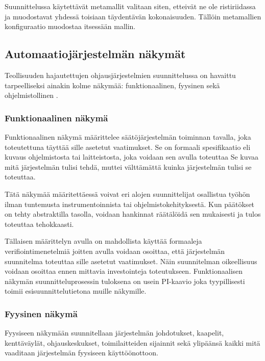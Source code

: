 \documentclass[finnish,12pt]{article}
\begin{document}
Suunnittelussa käytettävät metamallit valitaan siten, etteivät ne ole ristiriidassa ja muodostavat yhdessä toisiaan täydentävän kokonaisuuden.
Tällöin metamallien konfiguraatio muodostaa itsessään mallin.


	\subsection{Automaatiojärjestelmän näkymät}

Teollisuuden hajautettujen ohjausjärjestelmien suunnittelussa on havaittu
tarpeelliseksi ainakin kolme näkymää: funktionaalinen, fyysinen sekä ohjelmistollinen \cite{RefWorks:38}.


		\subsubsection{Funktionaalinen näkymä}

Funktionaalinen näkymä määrittelee säätöjärjestelmän toiminnan tavalla, joka toteutettuna täyttää sille asetetut vaatimukset.
Se on formaali spesifikaatio eli kuvaus ohjelmistosta tai laitteistosta, joka voidaan sen avulla toteuttaa
 Se kuvaa mitä järjestelmän tulisi tehdä, muttei välttämättä kuinka järjestelmän tulisi se toteuttaa.

Tätä näkymää määritettäessä voivat eri alojen suunnittelijat osallistua työhön ilman
tuntemusta instrumentoinnista tai ohjelmistokehityksestä. Kun päätökset on tehty
abstraktilla tasolla, voidaan hankinnat räätälöidä sen mukaisesti ja tulos
toteuttaa tehokkaasti.

Tällaisen määrittelyn avulla on mahdollista käyttää formaaleja verifiointimenetelmiä joitten avulla
voidaan osoittaa, että järjestelmän suunnitelma toteuttaa sille asetetut vaatimukset.
Näin suunnitelman oikeellisuus voidaan osoittaa ennen mittavia investointeja toteutukseen.
Funktionaalisen näkymän suunnitteluprosessin tuloksena on usein
PI-kaavio joka tyypillisesti toimii esisuunnittelutietona muille näkymille.


		\subsubsection{Fyysinen näkymä}

Fyysiseen näkymään suunnitellaan järjestelmän johdotukset, kaapelit, kenttäväylät,
ohjauskeskukset, toimilaitteiden sijainnit sekä ylipäänsä kaikki mitä vaaditaan 
järjestelmän fyysiseen käyttöönottoon.

\end{document}
